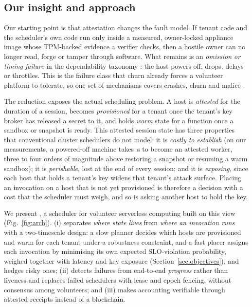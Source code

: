 \subsection{Our insight and approach}
Our starting point is that attestation changes the fault model. If tenant code and the scheduler's own code run only inside
a measured, owner-locked appliance image whose TPM-backed evidence a verifier checks, then a hostile owner can no longer
read, forge or tamper through software. What remains is an \emph{omission or timing failure} in the dependability taxonomy
\cite{cristian1991understanding,avizienis2004basic}: the host powers off, drops, delays or throttles. This is the failure
class that churn already forces a volunteer platform to tolerate, so one set of mechanisms covers crashes, churn and
malice \cite{levin2009trinc,veronese2013minbft}.

The reduction exposes the actual scheduling problem. A host is \emph{attested} for the duration of a session, becomes
\emph{provisioned} for a tenant once the tenant's key broker has released a secret to it, and holds \emph{warm} state for a
function once a sandbox or snapshot is ready. This attested session state has three properties that conventional
cluster schedulers do not model: it is \emph{costly to establish} (on our measurements, a powered-off machine takes
\CalAttested\,s to become an attested worker, three to four orders of magnitude above restoring a snapshot or resuming a warm sandbox); it is \emph{perishable}, lost at
the end of every session; and it is \emph{exposing}, since each host that holds a tenant's key widens that tenant's attack
surface. Placing an invocation on a host that is not yet provisioned is therefore a decision with a cost that the scheduler must weigh, and so is asking
another host to hold the key.

We present \voss{}, a scheduler for volunteer serverless computing built on this view (Fig.~\ref{fig:arch}). \voss{}
(i) separates \emph{where state lives} from \emph{where an invocation runs} with a two-timescale design: a slow planner
decides which hosts are provisioned and warm for each tenant under a robustness constraint, and a fast placer assigns each
invocation by minimising its own expected SLO-violation probability, weighed together with latency and key exposure (Section~\ref{sec:objectives}), and hedges risky ones; (ii) detects failures from end-to-end \emph{progress} rather than liveness and
replaces failed schedulers with lease and epoch fencing, without consensus among volunteers; and (iii) makes accounting
verifiable through attested receipts instead of a blockchain.

